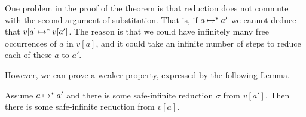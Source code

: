One problem in the proof of the theorem 
is that reduction does not commute with the second argument of substitution. 
That is, if $a \mathbin{\mapsto}^* a'$ we cannot deduce that $v[a] \mathbin{\mapsto}^* v[a']$. 
The reason is that we could have infinitely many free occurrences of $a$ in $v[a]$, and it could take
an infinite number of steps to reduce each of these $a$ to $a'$.

However, we can prove a weaker property, expressed by the following Lemma.


\begin{lemma}
 \label{lemma-safe-infinite-substitution}
 Assume $a \mathbin{\mapsto}^* a'$ and there is some safe-infinite reduction $\sigma$ from $v[a']$.
 Then there is some safe-infinite reduction from $v[a]$.
\end{lemma}

